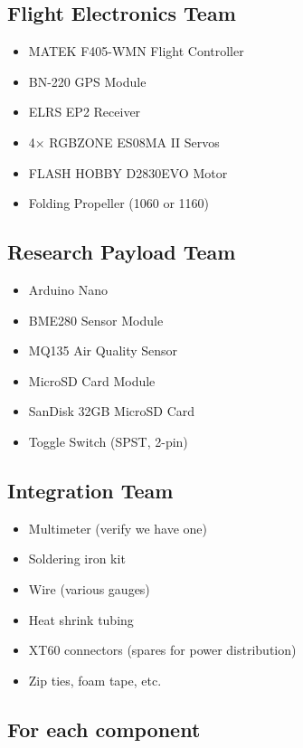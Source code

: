 \documentclass[11pt,letterpaper]{article}
\begin{document}
{\subsection{Flight Electronics Team}

\begin{itemize}
  \item MATEK F405-WMN Flight Controller
  \item BN-220 GPS Module
  \item ELRS EP2 Receiver
  \item 4$\times$ RGBZONE ES08MA II Servos
  \item FLASH HOBBY D2830EVO Motor
  \item Folding Propeller (1060 or 1160)
\end{itemize}

\subsection{Research Payload Team}

\begin{itemize}
  \item Arduino Nano
  \item BME280 Sensor Module
  \item MQ135 Air Quality Sensor
  \item MicroSD Card Module
  \item SanDisk 32GB MicroSD Card
  \item Toggle Switch (SPST, 2-pin)
\end{itemize}

\subsection{Integration Team}

\begin{itemize}
  \item Multimeter (verify we have one)
  \item Soldering iron kit
  \item Wire (various gauges)
  \item Heat shrink tubing
  \item XT60 connectors (spares for power distribution)
  \item Zip ties, foam tape, etc.
\end{itemize}

\subsection{For each component}

}
\end{document}
